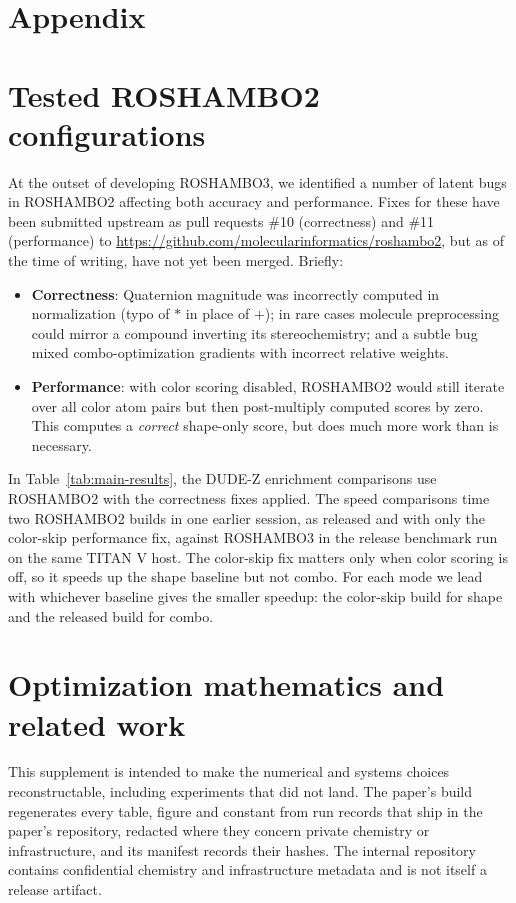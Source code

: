 \section*{Appendix}

\section{Tested ROSHAMBO2 configurations}
\label{app:roshambo2fixes}
At the outset of developing ROSHAMBO3, we identified a number of latent
bugs in ROSHAMBO2 affecting both accuracy and performance. Fixes for these
have been submitted upstream as pull requests \#10 (correctness) and \#11
(performance) to \url{https://github.com/molecularinformatics/roshambo2}, but
as of the time of writing, have not yet been merged. Briefly:
\begin{itemize}
	\item \textbf{Correctness}: Quaternion magnitude was incorrectly computed in normalization (typo of $*$ in place of $+$); in rare cases molecule preprocessing could mirror a compound inverting its stereochemistry; and a subtle bug mixed combo-optimization gradients with incorrect relative weights.
    \item \textbf{Performance}: with color scoring disabled, ROSHAMBO2 would still iterate over all color atom pairs but then post-multiply computed scores by zero. This computes a \emph{correct} shape-only score, but does much more work than is necessary.
\end{itemize}

In Table~\ref{tab:main-results}, the DUDE-Z enrichment comparisons use ROSHAMBO2 with the correctness fixes applied. The speed comparisons time two ROSHAMBO2 builds in one earlier session, as released and with only the color-skip performance fix, against ROSHAMBO3 in the release benchmark run on the same TITAN V host. The color-skip fix matters only when color scoring is off, so it speeds up the shape baseline but not combo. For each mode we lead with whichever baseline gives the smaller speedup: the color-skip build for shape and the released build for combo.

\section{Optimization mathematics and related work}
\label{app:methods}

This supplement is intended to make the numerical and systems choices
reconstructable, including experiments that did not land. The paper's build
regenerates every table, figure and constant from run records that ship in the
paper's repository, redacted where they concern private chemistry or
infrastructure, and its manifest records their hashes. The internal repository
contains confidential chemistry and infrastructure metadata and is not itself a
release artifact.

